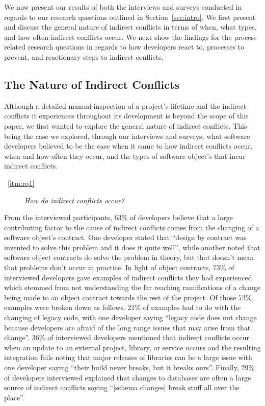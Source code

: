 \documentclass[conference]{IEEEtran}
\begin{document}
We now present our results of both the interviews and surveys conducted in regards to our research questions
outlined in Section~\ref{sec:intro}. We first present and discuss the general nature of indirect conflicts in
terms of when, what types, and how often indirect conflicts occur. We next show the findings for the process
related research questions in regards to how developers react to, processes to prevent, and reactionary steps
to indirect conflicts.

\subsection{The Nature of Indirect Conflicts}

Although a detailed manual inspection of a project's lifetime and the indirect conflicts it experiences throughout
its development is beyond the scope of this paper, we first wanted to explore the general nature of indirect 
conflicts. This being the case we explored, through our interviews and surveys, what software developers believed
to be the case when it came to how indirect conflicts occur, when and how often they occur, and the types of 
software object's that incur indirect conflicts.

\begin{description}
	\item[~\ref{itm:rq1}] \textit{How do indirect conflicts occur?}
\end{description}

From the interviewed participants, 63\% of developers believe that a large contributing factor to the cause
of indirect conflicts comes from the changing of a software object's contract. One developer stated that ``design
by contract was invented to solve this problem and it does it quite well'', while another noted that software 
object contracts do solve the problem in theory, but that doesn't mean that problems don't occur in practice.
In light of object contracts, 73\% of interviewed developers gave examples of indirect conflicts they had experienced
which stemmed from not understanding the far reaching ramifications of a change being made to an object contract
towards the rest of the project. Of those 73\%, examples were broken down as follows. 21\% of examples had to do 
with the changing of legacy code, with one developer saying ``legacy code does not change because developers 
are afraid of the long range issues that may arise from that change''. 36\% of interviewed developers mentioned 
that indirect conflicts occur when an update to an external project, library, or service occurs and the resulting 
integration fails noting that major releases of libraries can be a large issue with one developer saying 
``their build never breaks, but it breaks ours''. Finally, 29\% of developers interviewed explained that changes to
databases are often a large source of indirect conflicts saying ``[schema changes] break stuff all over the place''.
\end{document}
